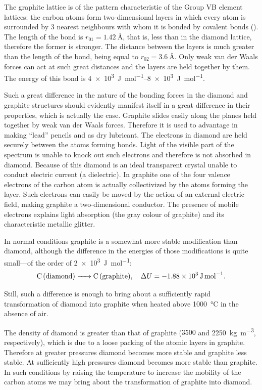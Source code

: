 The graphite lattice is of the pattern characteristic of the Group VB element lattices: the carbon atoms form two-dimensional layers in which every atom is surrounded by $3$ nearest neighbours with whom it is bonded by covalent bonds (). The length of the bond is $r_{01}=\SI{1.42}{\angstrom}$, that is, less than in the diamond lattice, therefore the former is stronger. The distance between the layers is much greater than the length of the  bond, being equal to $r_{02}=\SI{3.6}{\angstrom}$. Only weak van der Waals forces can act at such great distances and the layers are held together by them. The energy of this bond is \SIrange{4e3}{8e3}{\joule\per\mole}.

Such a great difference in the nature of the bonding forces in the diamond and graphite structures should evidently manifest itself in a great difference in their properties, which is actually the case. Graphite slides easily along the planes held together by weak van der Waals forces. Therefore it is used to advantage in making ``lead'' pencils and as dry lubricant. The electrons in diamond are held securely between the atoms forming bonds. Light of the visible part of the spectrum is unable to knock out such electrons and therefore is not absorbed in diamond. Because of this diamond is an ideal transparent crystal unable to conduct electric current (a dielectric). In graphite one of the four valence electrons of the carbon atom is actually collectivized by the atoms forming the layer. Such electrons can easily be moved by the action of an external electric field, making graphite a two-dimensional conductor. The presence of mobile electrons explains light absorption (the gray colour of graphite) and its characteristic metallic glitter.

In normal conditions graphite is a somewhat more stable modification than diamond, although the difference in the energies of those modifications is quite small---of the order of \SI{2e3}{\joule\per\mole}:
\begin{equation*}
	\ce{C \text{(diamond)} -> C \text{(graphite)}},\quad \Delta{U} = \SI{-1.88e3}{\joule\per\mole}.
\end{equation*}

Still, such a difference is enough to bring about a sufficiently rapid transformation of diamond into graphite when heated above \SI{1000}{\degreeCelsius} in the absence of air.

The density of diamond is greater than that of graphite ($3500$ and \SI{2250}{\kilo\gram\per\metre\cubed}, respectively), which is due to a loose packing of the atomic layers in graphite. Therefore at greater pressures diamond becomes more stable and graphite less stable. At sufficiently high pressures diamond becomes more stable than graphite. In such conditions by raising the temperature to increase the mobility of the carbon atoms we may bring about the transformation of graphite into diamond.

